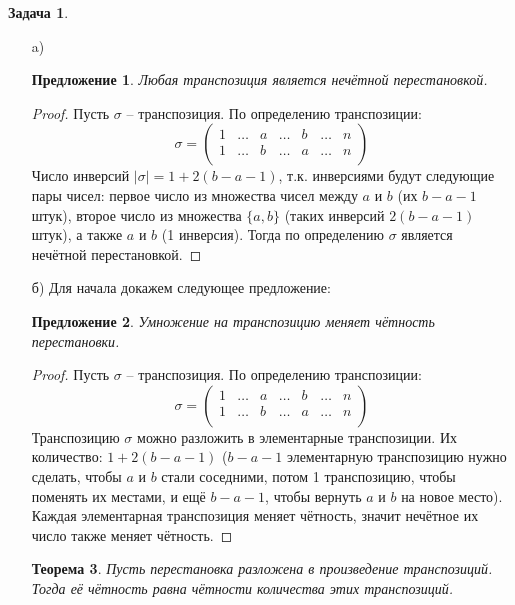 \documentclass[12pt]{article}
\newtheorem{theorem}{Теорема}
\newtheorem{predl}[theorem]{Предложение}
\theoremstyle{definition}
\newtheorem{zad}{Задача}[section]
\begin{document}
\begin{zad}
\begin{itemize}
\item[a)]
\begin{predl}
Любая транспозиция является нечётной перестановкой.
\end{predl}
\begin{proof}
Пусть $\sigma$ -- транспозиция. По определению транспозиции:
\begin{equation}
    \sigma=
    \left(
\begin{array}{ccccccc}
1 & \hdots & a & \hdots & b & \hdots & n\\
1 & \hdots & b & \hdots & a & \hdots & n\\
\end{array}
\right)
\end{equation}
Число инверсий $|\sigma|=1+2(b-a-1)$, т.к. инверсиями будут следующие пары чисел: первое число из множества чисел между $a$ и $b$ (их $b-a-1$ штук), второе число из множества $\{a,b\}$ (таких инверсий $2(b-a-1)$ штук), а также $a$ и $b$ (1 инверсия). Тогда по определению $\sigma$ является нечётной перестановкой.
\end{proof}
\item[б)] Для начала докажем следующее предложение:
\begin{predl}\label{pr1}
Умножение на транспозицию меняет чётность перестановки.
\end{predl}
\begin{proof}
Пусть $\sigma$ -- транспозиция. По определению транспозиции:
\begin{equation}
    \sigma=
    \left(
\begin{array}{ccccccc}
1 & \hdots & a & \hdots & b & \hdots & n\\
1 & \hdots & b & \hdots & a & \hdots & n\\
\end{array}
\right)
\end{equation}
Транспозицию $\sigma$ можно разложить в элементарные транспозиции. Их количество: $1+2(b-a-1)$ ($b-a-1$ элементарную транспозицию нужно сделать, чтобы $a$ и $b$ стали соседними, потом 1 транспозицию, чтобы поменять их местами, и ещё $b-a-1$, чтобы вернуть $a$ и $b$ на новое место). Каждая элементарная транспозиция меняет чётность, значит нечётное их число также меняет чётность. 
\end{proof}
\begin{theorem}\label{pr2}
Пусть перестановка разложена в произведение транспозиций. Тогда её чётность равна чётности количества этих транспозиций.

\end{theorem}
\end{itemize}
\end{zad}
\end{document}
